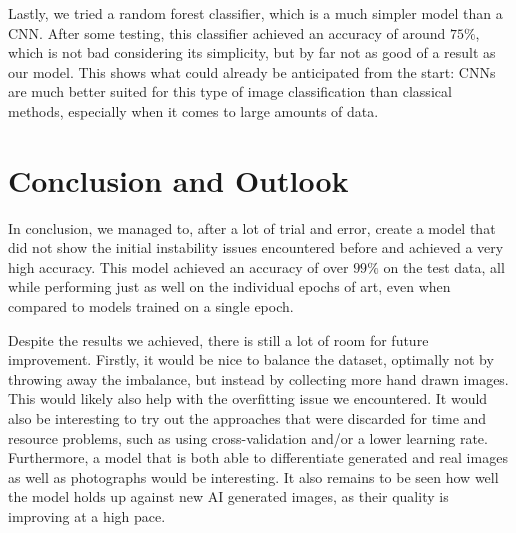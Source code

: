Lastly, we tried a random forest classifier, which is a much simpler model than a CNN.
After some testing, this classifier achieved an accuracy of around $75 \%$, which is not bad considering its simplicity, but by far not as good of a result as our model.
This shows what could already be anticipated from the start: CNNs are much better suited for this type of image classification than classical methods,
especially when it comes to large amounts of data. \\

\section{Conclusion and Outlook}

In conclusion, we managed to, after a lot of trial and error, create a model that did not show the initial instability issues encountered before and achieved a very high accuracy.
This model achieved an accuracy of over $99 \%$ on the test data, all while performing just as well on the individual epochs of art,
even when compared to models trained on a single epoch.

Despite the results we achieved, there is still a lot of room for future improvement.
Firstly, it would be nice to balance the dataset, optimally not by throwing away the imbalance, but instead by collecting more hand drawn images.
This would likely also help with the overfitting issue we encountered.
It would also be interesting to try out the approaches that were discarded for time and resource problems, such as using cross-validation and/or a lower learning rate.
Furthermore, a model that is both able to differentiate generated and real images as well as photographs would be interesting.
It also remains to be seen how well the model holds up against new AI generated images, as their quality is improving at a high pace.


